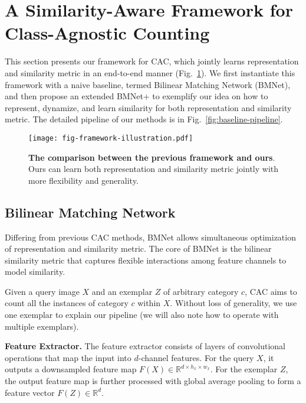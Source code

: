 \documentclass[10pt,twocolumn,letterpaper]{article}
\newcommand{\margin}{\vspace{3pt}\noindent}
\begin{document}
\section{A Similarity-Aware Framework for Class-Agnostic Counting}
This section presents our framework for CAC, which jointly learns representation and similarity metric in an end-to-end manner (Fig.~\ref{fig:basic-framework}). We first instantiate this framework with a naive baseline, termed Bilinear Matching Network (BMNet), and then propose an extended BMNet+ to exemplify our idea on how to represent, dynamize, and learn similarity for both representation and similarity metric. The detailed pipeline of our methods is in Fig.~\ref{fig:baseline-pipeline}.
\begin{figure}[t]
  \centering
   \texttt{[image: fig-framework-illustration.pdf]}\vspace{-5pt}
   \caption{\textbf{The comparison between the previous framework and ours}. Ours can learn both representation and similarity metric jointly with more flexibility and generality.}
   \label{fig:basic-framework}
   \vspace{-5pt}
\end{figure}

\subsection{Bilinear Matching Network}
\label{sec:bmn}
Differing from previous CAC methods, BMNet allows simultaneous optimization of representation and similarity metric. The core of BMNet is the bilinear similarity metric that captures flexible interactions among feature channels to model similarity. 

Given a query image $X$ and an exemplar $Z$ of arbitrary category $c$, CAC aims to count all the instances of category $c$ within $X$. Without loss of generality, we use one exemplar to explain our pipeline (we will also note how to operate with multiple exemplars). 

\margin
\textbf{Feature Extractor. }
The feature extractor consists of layers of convolutional operations that map the input into $d$-channel features. For the query $X$, it outputs a downsampled feature map $F(X)\in \mathbb{R}^{d\times h_x\times w_x}$. For the exemplar $Z$, the output feature map is further processed with global average pooling to form a feature vector $F(Z)\in \mathbb{R}^{d}$. 
\end{document}
